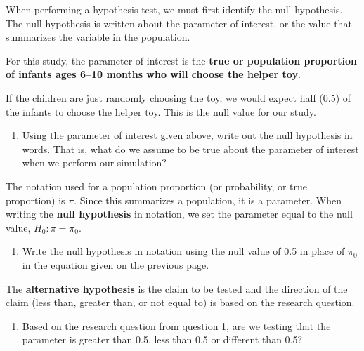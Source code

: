 \documentclass[
]{report}
\providecommand{\tightlist}{%
  \setlength{\itemsep}{0pt}\setlength{\parskip}{0pt}}
\begin{document}
When performing a hypothesis test, we must first identify the null hypothesis. The null hypothesis is written about the parameter of interest, or the value that summarizes the variable in the population.

For this study, the parameter of interest is the \textbf{true or population proportion of infants ages 6--10 months who will choose the helper toy}.

If the children are just randomly choosing the toy, we would expect half (0.5) of the infants to choose the helper toy. This is the null value for our study.

\begin{enumerate}
\def\labelenumi{\arabic{enumi}.}
\setcounter{enumi}{4}
\tightlist
\item
  Using the parameter of interest given above, write out the null hypothesis in words. That is, what do we assume to be true about the parameter of interest when we perform our simulation?
  \vspace{0.8in}
\end{enumerate}

The notation used for a population proportion (or probability, or true proportion) is \(\pi\). Since this summarizes a population, it is a parameter. When writing the \textbf{null hypothesis} in notation, we set the parameter equal to the null value, \(H_0: \pi = \pi_0\).

\newpage

\begin{enumerate}
\def\labelenumi{\arabic{enumi}.}
\setcounter{enumi}{5}
\tightlist
\item
  Write the null hypothesis in notation using the null value of 0.5 in place of \(\pi_0\) in the equation given on the previous page.
\end{enumerate}

\vspace{0.5in}

The \textbf{alternative hypothesis} is the claim to be tested and the direction of the claim (less than, greater than, or not equal to) is based on the research question.

\begin{enumerate}
\def\labelenumi{\arabic{enumi}.}
\setcounter{enumi}{6}
\tightlist
\item
  Based on the research question from question 1, are we testing that the parameter is greater than 0.5, less than 0.5 or different than 0.5?
\end{enumerate}
\end{document}
